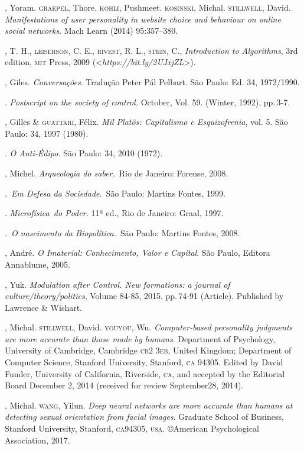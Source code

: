 \begin{bibliohedra}
, Yoram. \textsc{graepel}, Thore. \textsc{kohli}, Pushmeet. \textsc{kosinski}, Michal.
\textsc{stillwell}, David. \emph{Manifestations of user personality in website
choice and behaviour on online social networks}. Mach Learn (2014) 95:357--380.

, T. H., \textsc{leiserson}, C. E., \textsc{rivest}, R. L., \textsc{stein}, C.,
\emph{Introduction to Algorithms}, 3rd edition, \textsc{mit} Press, 2009
(\textless{}\emph{https://bit.ly/2UJxjZL}\textgreater{}).

, Giles. \emph{Conversações}. Tradução Peter Pál Pelbart. São Paulo: Ed. 34,  1972/1990.

\titidem. \emph{Postscript on the society of control.} October,
Vol. 59. (Winter, 1992), pp.\,3-7.

, Gilles \& \textsc{guattari}, Félix. \emph{Mil Platôs: Capitalismo e
Esquizofrenia}, vol. 5. São Paulo: 34, 1997 (1980).

\titidem. \emph{O Anti-Édipo.} São Paulo: 34, 2010 (1972).

, Michel. \emph{Arqueologia do saber.}~Rio de Janeiro:
Forense, 2008.

\titidem.~\emph{Em Defesa da Sociedade}.~São Paulo: Martins
Fontes, 1999.

\titidem. \emph{Microfísica~do Poder.} 11ª ed., Rio de
Janeiro: Graal, 1997.

\titidem.~\emph{O nascimento da Biopolítica.}~São Paulo:
Martins Fontes, 2008.

, André. \emph{O Imaterial: Conhecimento, Valor e Capital}. São
Paulo, Editora Annablume, 2005.

, Yuk. \emph{Modulation after Control. New formations: a journal of
culture/theory/politics}, Volume 84-85, 2015. pp.\,74-91 (Article).
Published by Lawrence \& Wishart.

, Michal. \textsc{stillwell}, David. \textsc{youyou}, Wu. \emph{Computer-based
personality judgments are more accurate than those made by
humans}. Department of Psychology, University of Cambridge, Cambridge \textsc{cb}2
3\textsc{eb}, United Kingdom; Department of Computer Science, Stanford
University, Stanford, \textsc{ca} 94305. Edited by David Funder, University of
California, Riverside, \textsc{ca}, and accepted by the Editorial Board December
2, 2014 (received for review September28, 2014).

, Michal. \textsc{wang}, Yilun. \emph{Deep neural networks are more
accurate than humans at detecting sexual orientation from facial
images}. Graduate School of Business, Stanford University,
Stanford, \textsc{ca}94305, \textsc{usa}. ©American Psychological Association, 2017.


\end{bibliohedra}
